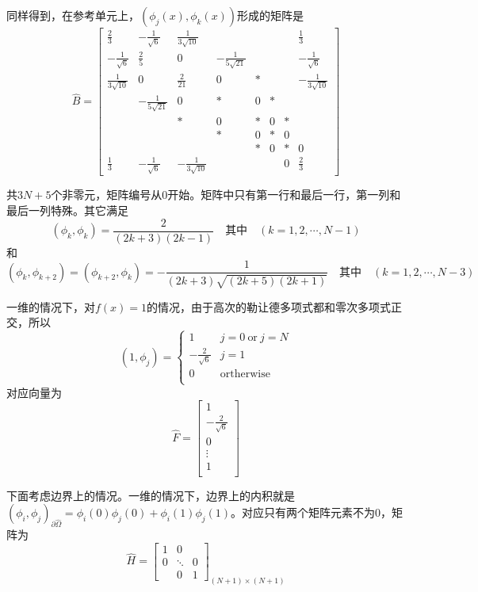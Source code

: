 \documentclass[UTF8,12pt]{article}
\begin{document}
同样得到，在参考单元上，$(\phi_j(x), \phi_k(x))$形成的矩阵是
\begin{equation}
\hat{B} = \left[ \begin{array}{cccccccc}
\frac23 & -\frac{1}{\sqrt{6}} & \frac{1}{3\sqrt{10}} &  &  &  &  & \frac13 \\ 
-\frac{1}{\sqrt{6}} & \frac25 & 0 & -\frac{1}{5\sqrt{21}} &  &  &  & -\frac{1}{\sqrt{6}} \\ 
\frac{1}{3\sqrt{10}} & 0 & \frac{2}{21} & 0 & * &  &  & -\frac{1}{3\sqrt{10}} \\ 
& -\frac{1}{5\sqrt{21}} & 0 & * & 0 & * &  &  \\ 
&  & * & 0 & * & 0 & * &  \\ 
&  &  & * & 0 & * & 0 &  \\ 
&  &  &  & * & 0 & * & 0 \\ 
\frac13 & -\frac{1}{\sqrt{6}} & -\frac{1}{3\sqrt{10}} &  &  &  & 0 & \frac23
\end{array}  \right]
\end{equation}

共$3N+5$个非零元，矩阵编号从0开始。矩阵中只有第一行和最后一行，第一列和最后一列特殊。其它满足
$$ (\phi_k, \phi_k) = \frac{2}{(2k+3)(2k-1)} \quad \text{其中} \quad (k = 1, 2, \cdots, N-1) $$
和
$$ (\phi_{k}, \phi_{k+2}) = (\phi_{k+2}, \phi_{k}) = -\frac{1}{(2k+3)\sqrt{(2k+5)(2k+1)}} \quad \text{其中} \quad (k = 1, 2, \cdots, N-3) $$

一维的情况下，对$f(x) = 1$的情况，由于高次的勒让德多项式都和零次多项式正交，所以
\begin{equation}
(1, \phi_j) = \left\{ \begin{array}{ll}
1 & j = 0 \ \text{or} \ j = N \\
-\frac{2}{\sqrt{6}} & j = 1 \\
0 & \text{ortherwise} \\
\end{array}  \right.
\end{equation}
对应向量为
\begin{equation}
\hat{F} = \left[ \begin{array}{c}
1 \\
-\frac{2}{\sqrt{6}} \\
0 \\
\vdots \\
1 \\
\end{array} \right]
\end{equation}

下面考虑边界上的情况。一维的情况下，边界上的内积就是$(\phi_i, \phi_j)_{\partial\hat{\Omega}} = \phi_i(0) \phi_j(0) + \phi_i(1) \phi_j(1)$。对应只有两个矩阵元素不为0，矩阵为
\begin{equation}
\hat{H} = \left[ \begin{array}{ccc}
1 & 0 &  \\ 
0 & \ddots & 0 \\ 
& 0 & 1
\end{array} \right]_{(N+1) \times (N+1)}
\end{equation}
\end{document}

